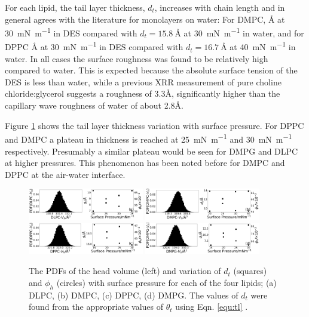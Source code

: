 \documentclass[amsmath,amssymb,twocolumn,superscriptaddress,aps,prl]{revtex4-1}
\begin{document}
For each lipid, the tail layer thickness, $d_t$, increases with chain length
and in general agrees with the literature for monolayers on
water\cite{Mohwald1990,Vaknin1991}:
For DMPC, \si{\angstrom} at
\SI{30}{\milli\newton\per\meter} in DES compared with
$d_t=\SI{15.8}{\angstrom}$ at
\SI{30}{\milli\newton\per\meter}\cite{Johnson1991} in water, and for
DPPC \si{\angstrom} at
\SI{30}{\milli\newton\per\meter} in DES compared with
$d_t=\SI{16.7}{\angstrom}$ at
\SI{40}{\milli\newton\per\meter}\cite{Helm1987} in water.
In all cases the surface roughness was found to be relatively high compared
to water.
This is expected because the absolute surface tension of the DES is less
than water, while a previous XRR measurement of pure choline
chloride:glycerol suggests a roughness of
3.3\si{\angstrom}\cite{Sanchez-Fernandez2016}, significantly higher than
the capillary wave roughness of water of about 2.8\si{\angstrom}.

Figure \ref{fig:lipresults} shows the tail layer thickness variation with
surface pressure. For DPPC and DMPC a plateau in thickness is reached at
\SI{25}{\milli\newton\per\meter} and \SI{30}{\milli\newton\per\meter}
respectively. Presumably a similar plateau would be seen for DMPG and DLPC
at higher pressures.
This phenomenon has been noted before for DMPC\cite{Bayerl1990} and
DPPC\cite{Campbell2018} at the air-water interface.
%
\begin{figure}
	\centering
  \includegraphics[width=0.45\textwidth]{figures/dlpc_vh_dt_phi}
	\includegraphics[width=0.45\textwidth]{figures/dmpc_vh_dt_phi}
	\includegraphics[width=0.45\textwidth]{figures/dppc_vh_dt_phi}
	\includegraphics[width=0.45\textwidth]{figures/dmpg_vh_dt_phi}
	\caption{\small The PDFs of the head volume (left) and variation of
  $d_t$ (squares) and $\phi_h$ (circles) with surface pressure for each of
  the four lipids; (a) DLPC, (b) DMPC, (c) DPPC, (d) DMPG. The values of
  $d_t$ were found from the appropriate values of $\theta_t$ using
  Eqn. \ref{equ:tl} \cite{SI2018}.}
	\label{fig:lipresults}
\end{figure}
%
\end{document}
